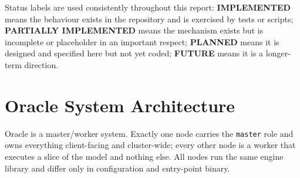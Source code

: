 \documentclass[11pt,a4paper]{article}
\newcommand{\stImp}{\textcolor{ogreen}{\footnotesize\textsf{\textbf{IMPLEMENTED}}}}
\newcommand{\stPart}{\textcolor{oamber}{\footnotesize\textsf{\textbf{PARTIALLY IMPLEMENTED}}}}
\newcommand{\stPlan}{\textcolor{oblue}{\footnotesize\textsf{\textbf{PLANNED}}}}
\newcommand{\stFut}{\textcolor{ored}{\footnotesize\textsf{\textbf{FUTURE}}}}
\begin{document}
Status labels are used consistently throughout this report:
\stImp{} means the behaviour exists in the repository and is exercised by tests
or scripts; \stPart{} means the mechanism exists but is incomplete or
placeholder in an important respect; \stPlan{} means it is designed and
specified here but not yet coded; \stFut{} means it is a longer-term direction.

\section{Oracle System Architecture}

Oracle is a master/worker system. Exactly one node carries the \texttt{master}
role and owns everything client-facing and cluster-wide; every other node is a
worker that executes a slice of the model and nothing else. All nodes run the
same engine library and differ only in configuration and entry-point binary.
\end{document}

